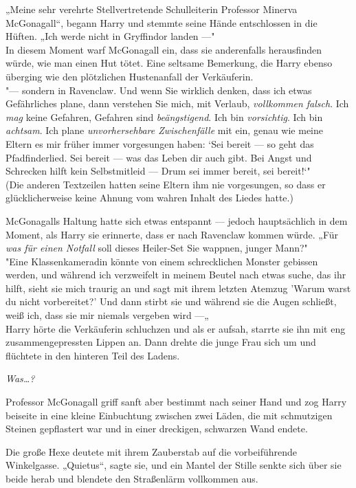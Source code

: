 {„Meine sehr verehrte Stellvertretende Schulleiterin Professor Minerva McGonagall“, begann Harry und stemmte seine Hände entschlossen in die Hüften. „Ich werde nicht in Gryffindor landen ---"\\ In diesem Moment warf McGonagall ein, dass sie anderenfalls herausfinden würde, wie man einen Hut tötet. Eine seltsame Bemerkung, die Harry ebenso überging wie den plötzlichen Hustenanfall der Verkäuferin.\\ "--- sondern in Ravenclaw. Und wenn Sie wirklich denken, dass ich etwas Gefährliches plane, dann verstehen Sie mich, mit Verlaub, \emph{vollkommen falsch}. Ich \emph{mag} keine Gefahren, Gefahren sind \emph{beängstigend}. Ich bin \emph{vorsichtig}. Ich bin \emph{achtsam}. Ich plane \emph{unvorhersehbare Zwischenfälle} mit ein, genau wie meine Eltern es mir früher immer vorgesungen haben: `Sei bereit --- so geht das Pfadfinderlied. Sei bereit --- was das Leben dir auch gibt. Bei Angst und Schrecken hilft kein Selbstmitleid --- Drum sei immer bereit, sei bereit!`"\\ (Die anderen Textzeilen hatten seine Eltern ihm nie vorgesungen, so dass er glücklicherweise keine Ahnung vom wahren Inhalt des Liedes hatte.)

McGonagalls Haltung hatte sich etwas entspannt --- jedoch hauptsächlich in dem Moment, als Harry sie erinnerte, dass er nach Ravenclaw kommen würde. „Für \emph{was für einen Notfall} soll dieses Heiler-Set Sie wappnen, junger Mann?"\\ "Eine Klassenkameradin könnte von einem schrecklichen Monster gebissen werden, und während ich verzweifelt in meinem Beutel nach etwas suche, das ihr hilft, sieht sie mich traurig an und sagt mit ihrem letzten Atemzug 'Warum warst du nicht vorbereitet?' Und dann stirbt sie und während sie die Augen schließt, weiß ich, dass sie mir niemals vergeben wird ---„\\ Harry hörte die Verkäuferin schluchzen und als er aufsah, starrte sie ihn mit eng zusammengepressten Lippen an. Dann drehte die junge Frau sich um und flüchtete in den hinteren Teil des Ladens.

\emph{Was…?}

Professor McGonagall griff sanft aber bestimmt nach seiner Hand und zog Harry beiseite in eine kleine Einbuchtung zwischen zwei Läden, die mit schmutzigen Steinen gepflastert war und in einer dreckigen, schwarzen Wand endete.

Die große Hexe deutete mit ihrem Zauberstab auf die vorbeiführende Winkelgasse. „Quietus“, sagte sie, und ein Mantel der Stille senkte sich über sie beide herab und blendete den Straßenlärm vollkommen aus.

}

